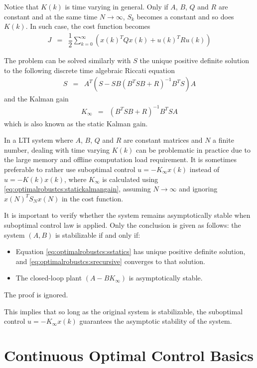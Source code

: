Notice that $K(k)$ is time varying in general. Only if $A$, $B$, $Q$ and $R$ are constant and at the same time $N\rightarrow\infty$, $S_k$ becomes a constant and so does $K(k)$. In such case, the cost function becomes
\begin{eqnarray}
	J &=& \dfrac{1}{2}\sum_{k=0}^{\infty}\left(x(k)^TQx(k) + u(k)^TRu(k)\right) \nonumber
\end{eqnarray}

The problem can be solved similarly with $S$ the unique positive definite solution to the following discrete time algebraic Riccati equation
\begin{eqnarray}
	S &=&  A^T\left(S-SB\left(B^TSB + R\right)^{-1}B^TS\right)A \label{eq:optimalrobustcs:sstatics}
\end{eqnarray}
and the Kalman gain
\begin{eqnarray}
	K_\infty &=& \left(B^TSB + R\right)^{-1}B^TSA \label{eq:optimalrobustcs:statickalmangain}
\end{eqnarray}
which is also known as the static Kalman gain.

In a LTI system where $A$, $B$, $Q$ and $R$ are constant matrices and $N$ a finite number, dealing with time varying $K(k)$ can be problematic in practice due to the large memory and offline computation load requirement. It is sometimes preferable to rather use suboptimal control $u=-K_\infty x(k)$ instead of $u=-K(k)x(k)$, where $K_\infty$ is calculated using \eqref{eq:optimalrobustcs:statickalmangain}, assuming $N\rightarrow\infty$ and ignoring $x(N)^TS_Nx(N)$ in the cost function.

It is important to verify whether the system remains asymptotically stable when suboptimal control law is applied. Only the conclusion is given as follows: the system $(A,B)$ is stabilizable if and only if:
\begin{itemize}
	\item Equation \eqref{eq:optimalrobustcs:sstatics} has unique positive definite solution, and \eqref{eq:optimalrobustcs:srecursive} converges to that solution.
	\item The closed-loop plant $(A-BK_\infty)$ is asymptotically stable.
\end{itemize}
The proof is ignored.

This implies that so long as the original system is stabilizable, the suboptimal control $u=-K_\infty x(k)$ guarantees the asymptotic stability of the system.

\section{Continuous Optimal Control Basics} \label{sec:continuous-optimal-control-basics}

